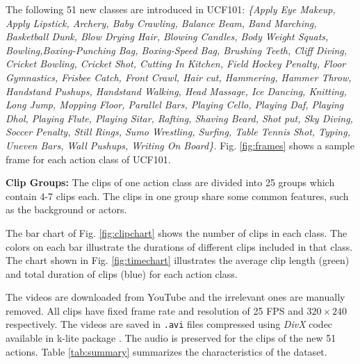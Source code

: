 \documentclass[10pt,twocolumn,letterpaper]{article}
\begin{document}
The following 51 new classes are introduced in UCF101:
\emph{\{{\color{NavyBlue}Apply Eye Makeup}, {\color{NavyBlue}Apply Lipstick}, {\color{ForestGreen}Archery},  {\color{red}Baby Crawling},  {\color{ForestGreen}Balance Beam},  {\color{RoyalPurple}Band Marching}, {\color{ForestGreen}Basketball Dunk},
{\color{NavyBlue}Blow Drying Hair}, {\color{red}Blowing Candles}, {\color{red}Body Weight Squats}, {\color{ForestGreen}Bowling},{\color{ForestGreen}Boxing-Punching Bag}, {\color{ForestGreen}Boxing-Speed Bag}, {\color{NavyBlue}Brushing Teeth},  {\color{ForestGreen}Cliff Diving}, {\color{ForestGreen}Cricket Bowling}, {\color{ForestGreen}Cricket Shot}, {\color{NavyBlue}Cutting In Kitchen}, {\color{ForestGreen}Field Hockey Penalty}, {\color{ForestGreen}Floor Gymnastics}, {\color{ForestGreen}Frisbee Catch}, {\color{ForestGreen}Front Crawl}, {\color{RoyalPurple}Hair cut}, {\color{NavyBlue}Hammering}, {\color{ForestGreen}Hammer Throw}, {\color{red}Handstand Pushups}, {\color{red}Handstand Walking}, {\color{RoyalPurple}Head Massage}, {\color{ForestGreen}Ice Dancing}, {\color{NavyBlue}Knitting}, {\color{ForestGreen}Long Jump}, {\color{NavyBlue}Mopping Floor}, {\color{ForestGreen}Parallel Bars}, {\color{YellowOrange}Playing Cello}, {\color{YellowOrange}Playing Daf}, {\color{YellowOrange}Playing Dhol}, {\color{YellowOrange}Playing Flute}, {\color{YellowOrange}Playing Sitar}, {\color{ForestGreen}Rafting}, {\color{NavyBlue}Shaving Beard}, {\color{ForestGreen}Shot put}, {\color{ForestGreen}Sky Diving}, {\color{ForestGreen}Soccer Penalty}, {\color{ForestGreen}Still Rings}, {\color{ForestGreen}Sumo Wrestling}, {\color{ForestGreen}Surfing}, {\color{ForestGreen}Table Tennis Shot}, {\color{NavyBlue}Typing}, {\color{ForestGreen}Uneven Bars}, {\color{red}Wall Pushups}, {\color{NavyBlue}Writing On Board}\}.
}
Fig. \ref{fig:frames} shows a sample frame for each action class of UCF101.

\textbf{Clip Groups: }The clips of one action class are divided into 25 groups which contain 4-7 clips each. The clips in one group share some common features, such as the background or actors.

The bar chart of Fig. \ref{fig:clipchart} shows the number of clips in each class. The colors on each bar illustrate the durations of different clips included in that class. The chart shown in Fig. \ref{fig:timechart} illustrates the average clip length (green) and total duration of clips (blue) for each action class.




The videos are downloaded from YouTube \cite{YouTube} and the irrelevant ones are manually removed. All clips have fixed frame rate and resolution of 25 FPS and $320\times240$ respectively. The videos are saved in {\tt .avi} files compressed using \emph{DivX} codec available in k-lite package \cite{klite}. The audio is preserved for the clips of the new 51 actions. Table \ref{tab:summary} summarizes the characteristics of the dataset.
\end{document}
